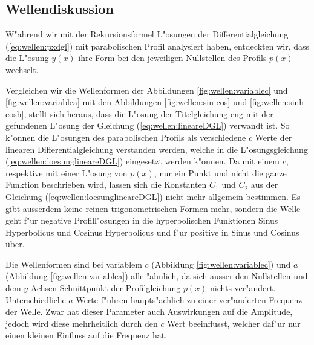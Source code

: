 \subsection{Wellendiskussion}
\label{sec:wellen:diskussionwellenform}
W"ahrend wir mit der Rekursionsformel L"osungen der Differentialgleichung 
(\ref{eq:wellen:pxdgl}) mit parabolischen Profil analysiert haben, entdeckten 
wir, dass die L"osung $y(x)$ ihre Form bei den jeweiligen Nullstellen des 
Profils $p(x)$ wechselt.

Vergleichen wir die Wellenformen der Abbildungen \ref{fig:wellen:variablec} und 
\ref{fig:wellen:variablea} mit den Abbildungen \ref{fig:wellen:sin-cos} und 
\ref{fig:wellen:sinh-cosh}, stellt sich heraus, dass die L"osung der 
Titelgleichung eng mit der gefundenen L"osung der Gleichung 
(\ref{eq:wellen:lineareDGL}) verwandt ist. So k"onnen die L"osungen des 
parabolischen Profils als verschiedene $c$ Werte der linearen 
Differentialgleichung verstanden werden, welche in die L"osungsgleichung 
(\ref{eq:wellen:loesunglineareDGL}) eingesetzt werden k"onnen. 
Da mit einem $c$, respektive mit einer L"osung von $p(x)$, nur ein Punkt 
und nicht die ganze Funktion beschrieben wird, lassen sich die Konstanten $C_1$ 
und $C_2$ aus der Gleichung (\ref{eq:wellen:loesunglineareDGL}) nicht mehr 
allgemein bestimmen. Es gibt ausserdem keine reinen trigonometrischen Formen 
mehr, sondern die Welle geht f"ur negative Profill"osungen in die 
hyperbolischen Funktionen Sinus Hyperbolicus und Cosinus Hyperbolicus und f"ur 
positive in Sinus und Cosinus über.

Die Wellenformen sind bei variablem $c$ (Abbildung \ref{fig:wellen:variablec}) 
und $a$ (Abbildung \ref{fig:wellen:variablea}) alle "ahnlich, da sich ausser 
den Nullstellen und dem $y$-Achsen Schnittpunkt der Profilgleichung $p(x)$ 
nichts ver"andert. Unterschiedliche $a$ Werte f"uhren haupts"achlich zu einer 
ver"anderten Frequenz der Welle. Zwar hat dieser Parameter auch Auswirkungen 
auf die Amplitude, jedoch wird diese mehrheitlich durch den $c$ Wert 
beeinflusst, welcher daf"ur nur einen kleinen Einfluss auf die Frequenz hat.

